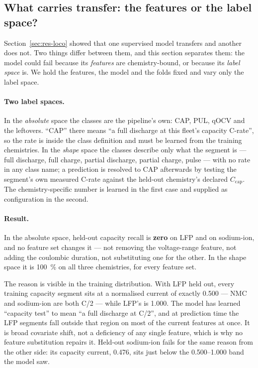 \documentclass[preprint,3p,number]{elsarticle}
\begin{document}
\subsection{What carries transfer: the features or the label space?}
\label{sec:res-ablation}

Section~\ref{sec:res-loco} showed that one supervised model transfers and
another does not. Two things differ between them, and this section separates
them: the model could fail because its \emph{features} are chemistry-bound, or
because its \emph{label space} is. We hold the features, the model and the folds
fixed and vary only the label space.

\paragraph{Two label spaces.} In the \emph{absolute} space the classes are the
pipeline's own: CAP, PUL, qOCV and the leftovers. ``CAP'' there means ``a full
discharge at this fleet's capacity C-rate'', so the rate is inside the class
definition and must be learned from the training chemistries. In the
\emph{shape} space the classes describe only what the segment is --- full
discharge, full charge, partial discharge, partial charge, pulse --- with no
rate in any class name; a prediction is resolved to CAP afterwards by testing
the segment's own measured C-rate against the held-out chemistry's declared
$C_{\mathrm{cap}}$. The chemistry-specific number is learned in the first case
and supplied as configuration in the second.

\paragraph{Result.} In the absolute space, held-out capacity recall is
\textbf{zero} on LFP and on sodium-ion, and no feature set changes it --- not
removing the voltage-range feature, not adding the coulombic duration, not
substituting one for the other. In the shape space it is \SI{100}{\percent} on
all three chemistries, for every feature set.

The reason is visible in the training distribution. With LFP held out, every
training capacity segment sits at a normalised current of exactly \num{0.500} ---
NMC and sodium-ion are both C/2 --- while LFP's is \num{1.000}. The model has
learned ``capacity test'' to mean ``a full discharge at C/2'', and at prediction
time the LFP segments fall outside that region on most of the current features
at once. It is broad covariate shift, not a deficiency of any single feature,
which is why no feature substitution repairs it. Held-out sodium-ion fails for
the same reason from the other side: its capacity current, \num{0.476}, sits
just below the \num{0.500}--\num{1.000} band the model saw.
\end{document}
